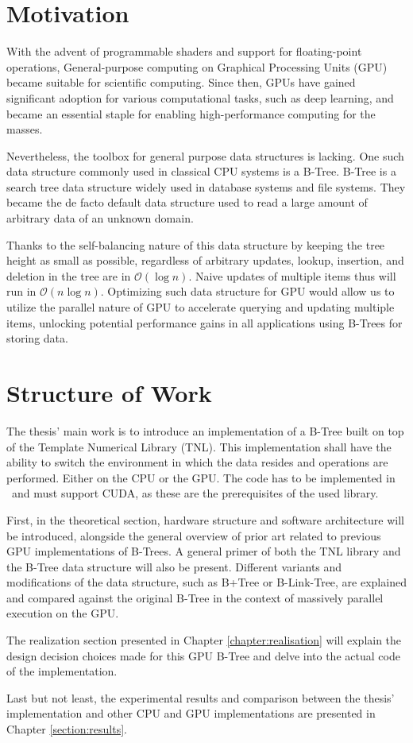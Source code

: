 \section{Motivation}

With the advent of programmable shaders and support for floating-point operations, General-purpose computing on Graphical Processing Units (GPU) became suitable for scientific computing. Since then, GPUs have gained significant adoption for various computational tasks, such as deep learning, and became an essential staple for enabling high-performance computing for the masses.

Nevertheless, the toolbox for general purpose data structures is lacking. One such data structure commonly used in classical CPU systems is a B-Tree. B-Tree is a search tree data structure widely used in database systems and file systems. They became the de facto default data structure used to read a large amount of arbitrary data of an unknown domain.

Thanks to the self-balancing nature of this data structure by keeping the tree height as small as possible, regardless of arbitrary updates, lookup, insertion, and deletion in the tree are in $\mathcal{O}(\log{n})$. Naive updates of multiple items thus will run in $\mathcal{O}(n \log{n})$. Optimizing such data structure for GPU would allow us to utilize the parallel nature of GPU to accelerate querying and updating multiple items, unlocking potential performance gains in all applications using B-Trees for storing data.

\section{Structure of Work}

The thesis' main work is to introduce an implementation of a B-Tree built on top of the Template Numerical Library (TNL). This implementation shall have the ability to switch the environment in which the data resides and operations are performed. Either on the CPU or the GPU. The code has to be implemented in \CC\ and must support CUDA, as these are the prerequisites of the used library.

First, in the theoretical section, hardware structure and software architecture will be introduced, alongside the general overview of prior art related to previous GPU implementations of B-Trees. A general primer of both the TNL library and the B-Tree data structure will also be present. Different variants and modifications of the data structure, such as B+Tree or B-Link-Tree, are explained and compared against the original B-Tree in the context of massively parallel execution on the GPU.

The realization section presented in Chapter \ref{chapter:realisation} will explain the design decision choices made for this GPU B-Tree and delve into the actual code of the implementation.

Last but not least, the experimental results and comparison between the thesis' implementation and other CPU and GPU implementations are presented in Chapter \ref{section:results}.